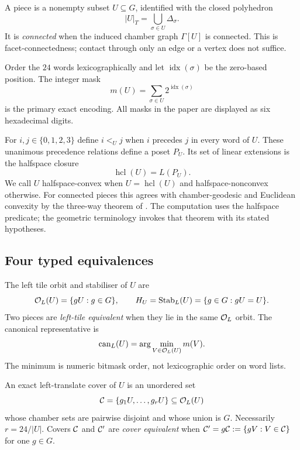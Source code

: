 \begin{definition}
A piece is a nonempty subset $U\subseteq G$, identified with the closed
polyhedron
\[
 |U|_T=\bigcup_{\sigma\in U}\Delta_\sigma.
\]
It is \emph{connected} when the induced chamber graph $\Gamma[U]$ is
connected.  This is facet-connectedness; contact through only an edge or a
vertex does not suffice.
\end{definition}

Order the $24$ words lexicographically and let $\operatorname{idx}(\sigma)$
be the zero-based position.  The integer mask
\[
 m(U)=\sum_{\sigma\in U}2^{\operatorname{idx}(\sigma)}
\]
is the primary exact encoding.  All masks in the paper are displayed as six
hexadecimal digits.

For $i,j\in\{0,1,2,3\}$ define $i<_{U}j$ when $i$ precedes $j$ in every word
of $U$.  These unanimous precedence relations define a poset $P_U$.  Its set
of linear extensions is the halfspace closure
\[
 \operatorname{hcl}(U)=L(P_U).
\]
We call $U$ halfspace-convex when $U=\operatorname{hcl}(U)$ and
halfspace-nonconvex otherwise.  For connected pieces this agrees with
chamber-geodesic and Euclidean convexity by the three-way theorem of
\cite{BabanskyyT2}.  The computation uses the halfspace predicate; the
geometric terminology invokes that theorem with its stated hypotheses.

\subsection{Four typed equivalences}

\begin{definition}
The left tile orbit and stabiliser of $U$ are
\[
 \mathcal O_L(U)=\{gU:g\in G\},
 \qquad H_U=\operatorname{Stab}_L(U)=\{g\in G:gU=U\}.
\]
Two pieces are \emph{left-tile equivalent} when they lie in the same
$\mathcal O_L$ orbit.  The canonical representative is
\[
 \operatorname{can}_L(U)=\arg\min_{V\in\mathcal O_L(U)}m(V).
\]
The minimum is numeric bitmask order, not lexicographic order on word lists.
\end{definition}

\begin{definition}
An exact left-translate cover of $U$ is an unordered set
\[
 \mathcal C=\{g_1U,\ldots,g_rU\}\subseteq\mathcal O_L(U)
\]
whose chamber sets are pairwise disjoint and whose union is $G$.  Necessarily
$r=24/|U|$.  Covers $\mathcal C$ and $\mathcal C'$ are \emph{cover equivalent} when
$\mathcal C'=g\mathcal C:=\{gV:V\in\mathcal C\}$ for one $g\in G$.
\end{definition}

